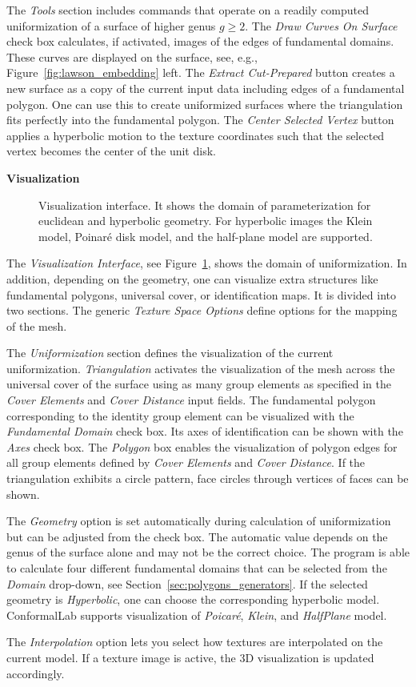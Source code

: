 \documentclass[Thesis.tex]{subfiles}
\begin{document}
The \emph{Tools} section includes commands that operate on a readily computed uniformization of a surface of higher genus $g\geq 2$. 
The \emph{Draw Curves On Surface} check box calculates, if activated, images of the edges of fundamental domains. 
These curves are displayed on the surface, see, e.g., Figure~\ref{fig:lawson_embedding} left. 
The \emph{Extract Cut-Prepared} button creates a new surface as a copy of the current input data including edges of a fundamental polygon. 
One can use this to create uniformized surfaces where the triangulation fits perfectly into the fundamental polygon. 
The \emph{Center Selected Vertex} button applies a hyperbolic motion to the texture coordinates such that the selected vertex becomes the center of the unit disk.

{\bf Visualization}

\begin{figure}
\caption{Visualization interface. It shows the domain of parameterization for euclidean and hyperbolic geometry. 
For hyperbolic images the Klein model, Poinar\'e disk model, and the half-plane model are supported.}
\label{fig:visualization_interfaces}
\end{figure}

The \emph{Visualization Interface}, see Figure~\ref{fig:visualization_interfaces}, shows the domain of uniformization. 
In addition, depending on the geometry, one can visualize extra structures like fundamental polygons, universal cover, or identification maps. 
It is divided into two sections. The generic \emph{Texture Space Options} define options for the mapping of the mesh. 

The \emph{Uniformization} section defines the visualization of the current uniformization. 
\emph{Triangulation} activates the visualization of the mesh across the universal cover of the surface using as many group elements as specified in the \emph{Cover Elements} and \emph{Cover Distance} input fields. 
The fundamental polygon corresponding to the identity group element can be visualized with the \emph{Fundamental Domain} check box. Its axes of identification can be shown with the \emph{Axes} check box. 
The \emph{Polygon} box enables the visualization of polygon edges for all group elements defined by \emph{Cover Elements} and \emph{Cover Distance}. 
If the triangulation exhibits a circle pattern, face circles through vertices of faces can be shown.

The \emph{Geometry} option is set automatically during calculation of uniformization but can be adjusted from the check box. The automatic value depends on the genus of the surface alone and may not be the correct choice. The program is able to calculate four different fundamental domains that can be selected from the \emph{Domain} drop-down, see Section~\ref{sec:polygons_generators}. If the selected geometry is \emph{Hyperbolic}, one can choose the corresponding hyperbolic model. {\sc ConformalLab} supports visualization of \emph{Poicar\'e}, \emph{Klein}, and \emph{HalfPlane} model.

The \emph{Interpolation} option lets you select how textures are interpolated on the current model. 
If a texture image is active, the 3D visualization is updated accordingly.


\subfilebibliography
\end{document}
